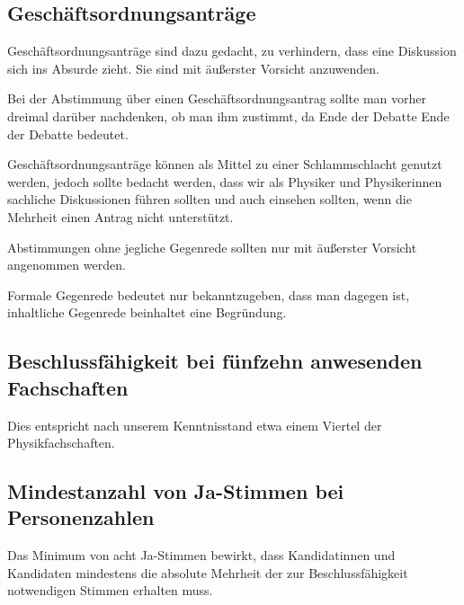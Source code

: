 \documentclass[12pt,oneside]{scrartcl}
\begin{document}
\subsection{Geschäftsordnungsanträge%
  \label{id1}%
}

Geschäftsordnungsanträge sind dazu gedacht, zu verhindern, dass eine Diskussion
sich ins Absurde zieht. Sie sind mit äußerster Vorsicht anzuwenden.

Bei der Abstimmung über einen Geschäftsordnungsantrag sollte man vorher dreimal
darüber nachdenken, ob man ihm zustimmt, da Ende der Debatte Ende der Debatte
bedeutet.

Geschäftsordnungsanträge können als Mittel zu einer Schlammschlacht genutzt
werden, jedoch sollte bedacht werden, dass wir als Physiker und Physikerinnen
sachliche Diskussionen führen sollten und auch einsehen sollten, wenn die
Mehrheit einen Antrag nicht unterstützt.

Abstimmungen ohne jegliche Gegenrede sollten nur mit äußerster Vorsicht
angenommen werden.

Formale Gegenrede bedeutet nur bekanntzugeben, dass man dagegen ist, inhaltliche
Gegenrede beinhaltet eine Begründung.


\subsection{Beschlussfähigkeit bei fünfzehn anwesenden Fachschaften%
  \label{beschlussfahigkeit-bei-funfzehn-anwesenden-fachschaften}%
}

Dies entspricht nach unserem Kenntnisstand etwa einem Viertel der Physikfachschaften.


\subsection{Mindestanzahl von Ja-Stimmen bei Personenzahlen%
  \label{mindestanzahl-von-ja-stimmen-bei-personenzahlen}%
}

Das Minimum von acht Ja-Stimmen bewirkt, dass Kandidatinnen und Kandidaten
mindestens die absolute Mehrheit der zur Beschlussfähigkeit notwendigen Stimmen
erhalten muss.
\end{document}
